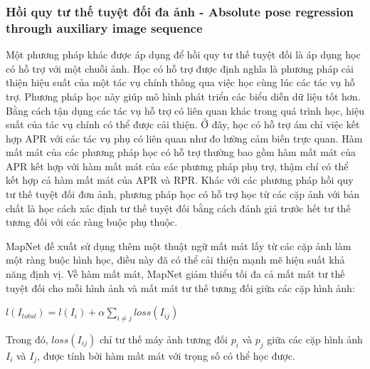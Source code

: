 \subsubsection*{Hồi quy tư thế tuyệt đối đa ảnh - Absolute pose regression through auxiliary image sequence}
Một phương pháp khác được áp dụng để hồi quy tư thế tuyệt đối là áp dụng học có hỗ trợ với một chuỗi ảnh. Học có hỗ trợ được định nghĩa là phương pháp cải thiện hiệu suất của một tác vụ chính thông qua việc học cùng lúc các tác vụ hỗ trợ. Phương pháp học này giúp mô hình phát triển các biểu diễn dữ liệu tốt hơn. Bằng cách tận dụng các tác vụ hỗ trợ có liên quan khác trong quá trình học, hiệu suất của tác vụ chính có thể được cải thiện. Ở đây, học có hỗ trợ ám chỉ việc kết hợp APR với các tác vụ phụ có liên quan như đo lường cảm biến trực quan. Hàm mất mát của các phương pháp học có hỗ trợ thường bao gồm hàm mất mát của APR kết hợp với hàm mất mát của các phương pháp phụ trợ, thậm chí có thể kết hợp cả hàm mất mát của APR và RPR. Khác với các phương pháp hồi quy tư thế tuyệt đối đơn ảnh, phương pháp học có hỗ trợ học từ các cặp ảnh với bản chất là học cách xác định tư thế tuyệt đối bằng cách đánh giá trước hết tư thế tương đối với các ràng buộc phụ thuộc.

MapNet \cite{brahmbhatt2018geometryaware} đề xuất sử dụng thêm một thuật ngữ mất mát lấy từ các cặp ảnh làm một ràng buộc hình học, điều này đã có thể cải thiện mạnh mẽ hiệu suất khả năng định vị. Về hàm mất mát, MapNet giảm thiểu tối đa cả mất mát tư thế tuyệt đối cho mỗi hình ảnh và mất mát tư thế tương đối giữa các cặp hình ảnh:
\begin{center}
    $l(I_{total}) = l(I_i) + \alpha\sum_{i\neq j}loss(I_{ij} )$
\end{center}
Trong đó, $loss(I_{ij} )$ chỉ tư thế máy ảnh tương đối $p_i$ và $p_j$ giữa các cặp hình ảnh $I_i$ và $I_j$, được tính bởi hàm mất mát với trọng số có thể học được.

